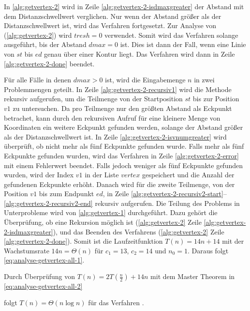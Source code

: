 In \autoref{alg:getvertex-2} wird in Zeile \ref{alg:getvertex-2-isdmaxgreater} der Abstand mit dem Distanzschwellwert
 verglichen. Nur wenn der Abstand größer als der Distanzschwellwert ist, wird das Verfahren fortgesetzt. Zur Analyse
 von  (\autoref{alg:getvertex-2}) wird $\mathit{tresh} = 0$ verwendet. Somit wird das
 Verfahren solange ausgeführt, bis der Abstand $\mathit{dmax} = 0$ ist. Dies ist dann der Fall, wenn eine Linie von
 $\mathit{st}$ bis $\mathit{ed}$ genau über einer Kontur liegt. Das Verfahren wird dann in Zeile
 \ref{alg:getvertex-2-done} beendet.

Für alle Fälle in denen $\mathit{dmax} > 0$ ist, wird die Eingabemenge $n$ in zwei Problemmengen geteilt. In Zeile
 \ref{alg:getvertex-2-recursiv1} wird die Methode  rekursiv aufgerufen, um die Teilmenge von der
 Startposition $\mathit{st}$ bis zur Position $\mathit{v1}$ zu untersuchen. Da  pro Teilmenge nur
 den größten Abstand als Eckpunkt betrachet, kann durch den rekursiven Aufruf für eine kleinere Menge von Koordinaten
 ein weitere Eckpunkt gefunden werden, solange der Abstand größer als der Distanzschwellwert ist. In Zeile
 \ref{alg:getvertex-2-isvnumgreater} wird überprüft, ob nicht mehr als fünf Eckpunkte gefunden wurde. Falls mehr als
 fünf Eckpunkte gefunden wurden, wird das Verfahren in Zeile \ref{alg:getvertex-2-error} mit einem Fehlerwert beendet.
 Falls jedoch weniger als fünf Eckpunkte gefunden wurden, wird der Index $\mathit{v1}$ in der Liste $\mathit{vertex}$
 gespeichert und die Anzahl der gefundenen Eckpunkte erhöht. Danach wird  für die zweite Teilmenge,
 von der Position $\mathit{v1}$ bis zum Endpunkt $\mathit{ed}$, in Zeile
  \ref{alg:getvertex-2-recursiv2-start}--\ref{alg:getvertex-2-recursiv2-end} rekursiv aufgerufen. Die Teilung des
 Problems in Unterprobleme wird von \autoref{alg:getvertex-1} durchgeführt. Dazu gehört die Überprüfung, ob eine
 Rekursion möglich ist (\autoref{alg:getvertex-2} Zeile \ref{alg:getvertex-2-isdmaxgreater}), und das Beenden des
 Verfahrens (\autoref{alg:getvertex-2} Zeile \ref{alg:getvertex-2-done}). Somit ist die Laufzeitfunktion
 $T(n) = 14n + 14$ mit der Wachstumsrate $14n = \Theta(n)$ für $c_{1} = 13$, $c_{2} = 14$ und $n_{0} = 1$. Daraus
 folgt \autoref{eq:analyse-getvertex-all-1}.

Durch Überprüfung von $T(n) = 2T(\tfrac{n}{2}) + 14n$ mit dem Master Theorem in \autoref{eq:analyse-getvertex-all-2}

folgt $T(n) = \Theta(n \log n)$ für das Verfahren .

